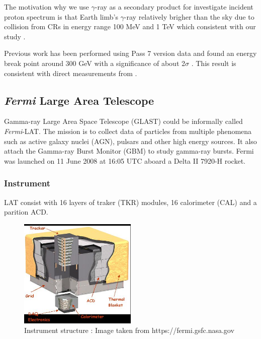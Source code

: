 \par The motivation why we use $\gamma$-ray as a secondary product for investigate incident proton spectrum is that Earth limb's $\gamma$-ray relatively brigher than the sky due to collision from CRs in energy range 100 MeV and 1 TeV which consistent with our study \cite{Warit2009}.

\par Previous work has been performed using Pass 7 version data \cite{FermiPass7} and found an energy break point around 300 GeV with a significance of about 2$\sigma$ \cite{previouswork}. This result is consistent with direct measurements from \cite{AMS-02,PAMELA}.


\subsection{\textit{Fermi} Large Area Telescope}

Gamma-ray Large Area Space Telescope (GLAST) could be informally called \textit{Fermi}-LAT. The mission is to collect data of particles from multiple phenomena such as active galaxy nuclei (AGN), pulsars and other high energy sources.
It also attach the Gamma-ray Burst Monitor (GBM) to study gamma-ray bursts. Fermi was launched on 11 June 2008 at 16:05 UTC aboard a Delta II 7920-H rocket.


\subsubsection*{Instrument}
LAT consist with 16 layers of traker (TKR) modules, 16 calorimeter (CAL) and a parition ACD. 

\begin{figure}[h!]
  \centering
    \includegraphics[width=0.5\textwidth]{img/LATStructure}
    \caption{Instrument structure : Image taken from https://fermi.gsfc.nasa.gov}
\end{figure}

